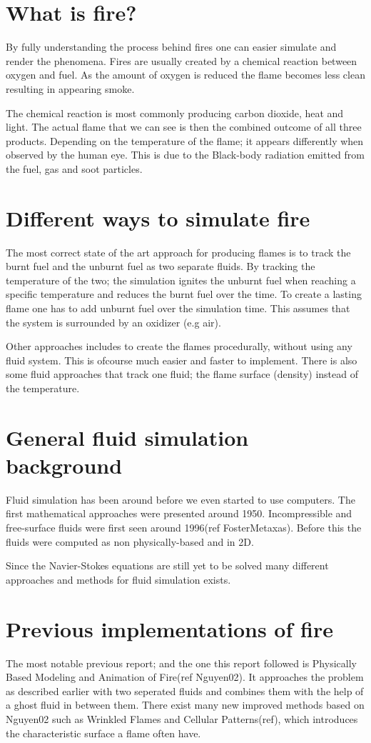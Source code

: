 \section{What is fire?}
By fully understanding the process behind fires one can easier simulate and render the phenomena. Fires are usually created by a chemical reaction between oxygen and fuel. As the amount of oxygen is reduced the flame becomes less clean resulting in appearing smoke. 

The chemical reaction is most commonly producing carbon dioxide, heat and light. The actual flame that we can see is then the combined outcome of all three products. Depending on the temperature of the flame; it appears differently when observed by the human eye. This is due to the Black-body radiation emitted from the fuel, gas and soot particles.

\section{Different ways to simulate fire}
The most correct state of the art approach for producing flames is to track the burnt fuel and the unburnt fuel as two separate fluids. By tracking the temperature of the two; the simulation ignites the unburnt fuel when reaching a specific temperature and reduces the burnt fuel over the time. To create a lasting flame one has to add unburnt fuel over the simulation time. This assumes that the system is surrounded by an oxidizer (e.g air).

Other approaches includes to create the flames procedurally, without using any fluid system. This is ofcourse much easier and faster to implement. There is also some fluid approaches that track one fluid; the flame surface (density) instead of the temperature.

\section{General fluid simulation background}
Fluid simulation has been around before we even started to use computers. The first mathematical approaches were presented around 1950. Incompressible and free-surface fluids were first seen around 1996(ref FosterMetaxas). Before this the fluids were computed as non physically-based and in 2D.

Since the Navier-Stokes equations are still yet to be solved many different approaches and methods for fluid simulation exists.

\section{Previous implementations of fire}
The most notable previous report; and the one this report followed is Physically Based Modeling and Animation of Fire(ref Nguyen02). It approaches the problem as described earlier with two seperated fluids and combines them with the help of a ghost fluid in between them. There exist many new improved methods based on Nguyen02 such as Wrinkled Flames and Cellular Patterns(ref), which introduces the characteristic surface a flame often have.